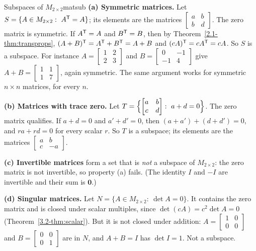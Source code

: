 \documentclass[11pt]{article}
\begin{document}
\begin{exmp}{Subspaces of $M_{2\times2}$}{matsub}
\textbf{(a) Symmetric matrices.} Let $S=\{A\in M_{2\times2}:\ A^{\mathsf T}=A\}$; its elements are the matrices $\begin{bmatrix}a&b\\b&d\end{bmatrix}$. The zero matrix is symmetric. If $A^{\mathsf T}=A$ and $B^{\mathsf T}=B$, then by Theorem~\ref{2.1-thm:transprops}, $(A+B)^{\mathsf T}=A^{\mathsf T}+B^{\mathsf T}=A+B$ and $(cA)^{\mathsf T}=cA^{\mathsf T}=cA$. So $S$ is a subspace. For instance $A=\begin{bmatrix}1&2\\2&3\end{bmatrix}$ and $B=\begin{bmatrix}0&-1\\-1&4\end{bmatrix}$ give $A+B=\begin{bmatrix}1&1\\1&7\end{bmatrix}$, again symmetric. The same argument works for symmetric $n\times n$ matrices, for every $n$.

\textbf{(b) Matrices with trace zero.} Let $T=\Bigl\{\begin{bmatrix}a&b\\c&d\end{bmatrix}:\ a+d=0\Bigr\}$. The zero matrix qualifies. If $a+d=0$ and $a'+d'=0$, then $(a+a')+(d+d')=0$, and $ra+rd=0$ for every scalar $r$. So $T$ is a subspace; its elements are the matrices $\begin{bmatrix}a&b\\c&-a\end{bmatrix}$.

\textbf{(c) Invertible matrices} form a set that is \emph{not} a subspace of $M_{2\times2}$: the zero matrix is not invertible, so property (a) fails. (The identity $I$ and $-I$ are invertible and their sum is $\mathbf{0}$.)

\textbf{(d) Singular matrices.} Let $N=\{A\in M_{2\times2}:\ \det A=0\}$. It contains the zero matrix and is closed under scalar multiples, since $\det(cA)=c^2\det A=0$ (Theorem~\ref{3.2-thm:scalar}). But it is not closed under addition: $A=\begin{bmatrix}1&0\\0&0\end{bmatrix}$ and $B=\begin{bmatrix}0&0\\0&1\end{bmatrix}$ are in $N$, and $A+B=I$ has $\det I=1$. Not a subspace.
\end{exmp}
\end{document}
